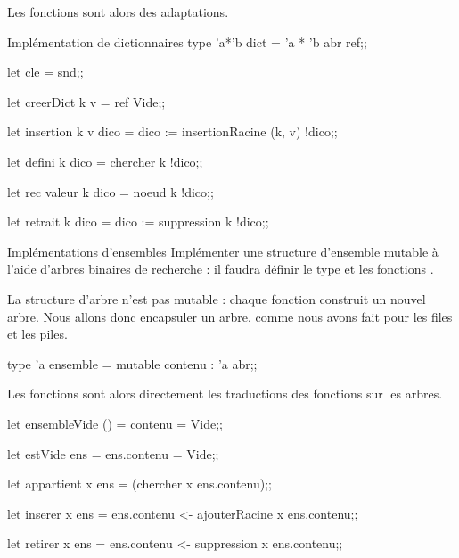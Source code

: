 Les fonctions sont alors des adaptations.
\begin{code}{Implémentation de dictionnaires}
type 'a*'b dict = 'a * 'b abr ref;;

let cle = snd;;

let creerDict k v = ref Vide;;

let insertion k v dico =
    dico := insertionRacine (k, v) !dico;;
    
let defini k dico
  = chercher k !dico;;
   
let rec valeur k dico = 
  noeud k !dico;;

let retrait k dico = 
  dico := suppression k !dico;;
\end{code}
\begin{exo}{Implémentations d'ensembles}{}
Implémenter une structure d'ensemble mutable à l'aide d'arbres binaires de recherche : il faudra définir le 
type et les fonctions .

\reponse

La structure d'arbre n'est pas mutable : chaque fonction construit un nouvel arbre. Nous allons donc encapsuler un arbre, comme nous avons fait pour les files et les piles.

\begin{ocaml}
type 'a ensemble = {mutable contenu : 'a abr};;
\end{ocaml}

Les fonctions sont alors directement les traductions des fonctions sur les arbres.

\begin{ocaml}
let ensembleVide () = {contenu = Vide};;

let estVide ens = ens.contenu = Vide;;

let appartient x ens  = (chercher x ens.contenu);;

let inserer x ens  = 
 ens.contenu <- ajouterRacine x ens.contenu;;

let retirer x ens  = 
 ens.contenu <- suppression x ens.contenu;;
\end{ocaml}
\end{exo}
